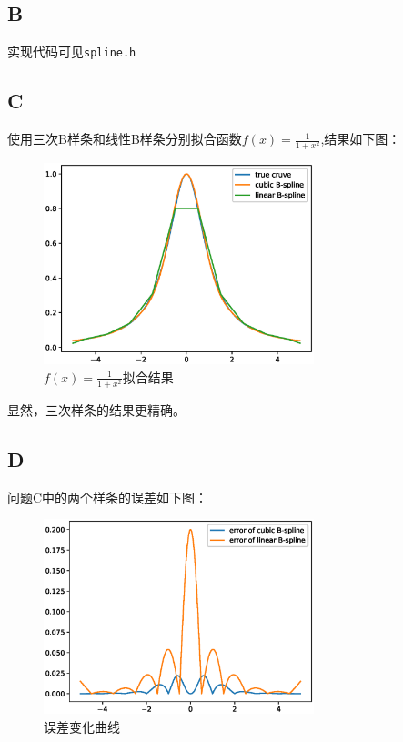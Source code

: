 \documentclass[12]{article}%
\begin{document}
    \subsection{B}
        实现代码可见\verb|spline.h|
    \subsection{C}
        使用三次B样条和线性B样条分别拟合函数$f(x)=\frac{1}{1+x^2}$,结果如下图：
        \begin{figure}[H]
            \centering
            \includegraphics[width=0.7\textwidth]{../pic/C.eps}
            \caption{$f(x)=\frac{1}{1+x^2}$拟合结果}
        \end{figure}

        显然，三次样条的结果更精确。
    \subsection{D}
        问题C中的两个样条的误差如下图：
        \begin{figure}[H]
            \centering
            \includegraphics[width=0.7\textwidth]{../pic/C2.eps}
            \caption{误差变化曲线}
        \end{figure}
\end{document}
